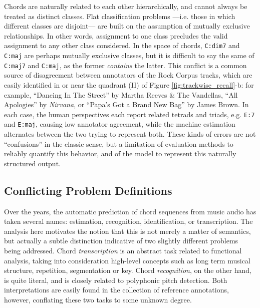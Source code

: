 \documentclass{article}
\begin{document}
Chords are naturally related to each other hierarchically, and cannot always be treated as distinct classes.
Flat classification problems ---i.e. those in which different classes are disjoint--- are built on the assumption of mutually exclusive relationships.
In other words, assignment to one class precludes the valid assignment to any other class considered.
In the space of chords, \texttt{C:dim7} and \texttt{C:maj} are perhaps mutually exclusive classes, but it is difficult to say the same of \texttt{C:maj7} and \texttt{C:maj}, as the former \emph{contains} the latter.
This conflict is a common source of disagreement between annotators of the Rock Corpus tracks, which are easily identified in or near the quadrant (II) of Figure \ref{fig:trackwise_recall}-b:
for example, ``Dancing In The Street'' by Martha Reeves \& The Vandellas, ``All Apologies'' by \emph{Nirvana}, or ``Papa's Got a Brand New Bag'' by James Brown.
In each case, the human perspectives each report related tetrads and triads, e.g. \texttt{E:7} and \texttt{E:maj}, causing low annotator agreement, while the machine estimation alternates between the two trying to represent both.
These kinds of errors are not ``confusions'' in the classic sense, but a limitation of evaluation methods to reliably quantify this behavior, and of the model to represent this naturally structured output.




\subsection{Conflicting Problem Definitions}

Over the years, the automatic prediction of chord sequences from music audio has taken several names: estimation, recognition, identification, or transcription.
The analysis here motivates the notion that this is not merely a matter of semantics, but actually a subtle distinction indicative of two slightly different problems being addressed.
Chord \emph{transcription} is an abstract task related to functional analysis, taking into consideration high-level concepts such as long term musical structure, repetition, segmentation or key.
Chord \emph{recognition}, on the other hand, is quite literal, and is closely related to polyphonic pitch detection.
Both interpretations are easily found in the collection of reference annotations, however, conflating these two tasks to some unknown degree.
\end{document}
